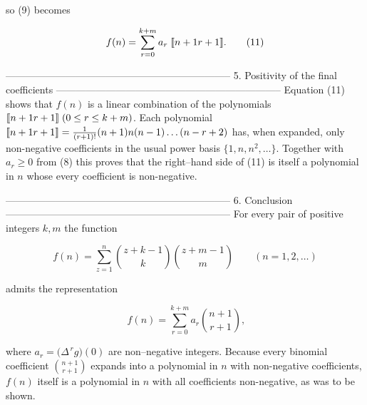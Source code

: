 so (9) becomes  

\[
f(n)=\sum_{r=0}^{k+m}a_{r}\;
      \llbracket n+1\\ r+1\rrbracket .
\tag{11}
\]

--------------------------------------------------------------------
5.  Positivity of the final coefficients  
--------------------------------------------------------------------
Equation (11) shows that \(f(n)\) is a linear combination of the
polynomials
\(\llbracket n+1\\ r+1\rrbracket\;(0\le r\le k+m)\).
Each polynomial \(\llbracket n+1\\ r+1\rrbracket
      =\tfrac1{(r+1)!}(n+1)n(n-1)\dots(n-r+2)\)
has, when expanded, only non-negative coefficients in the usual power
basis \(\{1,n,n^{2},\dots\}\).
Together with \(a_{r}\ge 0\) from (8) this proves that the right–hand
side of (11) is itself a polynomial in \(n\) whose every coefficient is
non-negative.

--------------------------------------------------------------------
6.  Conclusion  
--------------------------------------------------------------------
For every pair of positive integers \(k,m\) the function  

\[
f(n)=\sum_{z=1}^{n}\binom{z+k-1}{k}\binom{z+m-1}{m}
\qquad(n=1,2,\dots)
\]

admits the representation  

\[
\boxed{\;
f(n)=\displaystyle\sum_{r=0}^{k+m}
        a_{r}\binom{n+1}{r+1}},
\]

where \(a_{r}=\bigl(\Delta^{\,r}g\bigr)(0)\) are non–negative integers.
Because every binomial coefficient \(\binom{n+1}{r+1}\) expands into a
polynomial in \(n\) with non-negative coefficients, \(f(n)\) itself is a
polynomial in \(n\) with all coefficients non-negative, as was to be
shown.